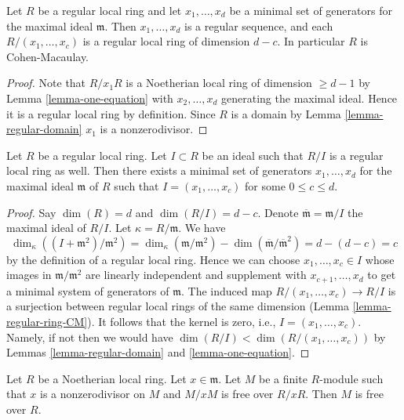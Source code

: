 \begin{lemma}
\label{lemma-regular-ring-CM}
Let $R$ be a regular local ring and let
$x_1, \ldots, x_d$ be a minimal set of generators
for the maximal ideal $\mathfrak m$. Then
$x_1, \ldots, x_d$ is a regular sequence, and
each $R/(x_1, \ldots, x_c)$ is a regular local ring
of dimension $d - c$. In particular $R$ is Cohen-Macaulay.
\end{lemma}

\begin{proof}
Note that $R/x_1R$ is a Noetherian local ring of dimension $\geq d - 1$
by Lemma \ref{lemma-one-equation} with $x_2, \ldots, x_d$
generating the maximal ideal. Hence it is a regular local ring by definition.
Since $R$ is a domain by Lemma \ref{lemma-regular-domain}
$x_1$ is a nonzerodivisor.
\end{proof}

\begin{lemma}
\label{lemma-regular-quotient-regular}
Let $R$ be a regular local ring. Let $I \subset R$ be an ideal
such that $R/I$ is a regular local ring as well. Then
there exists a minimal set of generators $x_1, \ldots, x_d$
for the maximal ideal $\mathfrak m$ of $R$ such that
$I = (x_1, \ldots, x_c)$ for some $0 \leq c \leq d$.
\end{lemma}

\begin{proof}
Say $\dim(R) = d$ and $\dim(R/I) = d - c$.
Denote $\overline{\mathfrak m} = \mathfrak m/I$ the
maximal ideal of $R/I$. Let $\kappa = R/\mathfrak m$. We have
$$
\dim_\kappa((I + \mathfrak m^2)/\mathfrak m^2) =
\dim_\kappa(\mathfrak m/\mathfrak m^2)
- \dim(\overline{\mathfrak m}/\overline{\mathfrak m}^2) = d - (d - c) = c
$$
by the definition of a regular local ring. Hence we can choose
$x_1, \ldots, x_c \in I$ whose images in $\mathfrak m/\mathfrak m^2$
are linearly independent and supplement with
$x_{c + 1}, \ldots, x_d$ to get a minimal system of generators of
$\mathfrak m$. The induced map $R/(x_1, \ldots, x_c) \to R/I$ is a
surjection between regular local rings of the same dimension
(Lemma \ref{lemma-regular-ring-CM}). It follows that
the kernel is zero, i.e., $I = (x_1, \ldots, x_c)$. Namely, if not
then we would have $\dim(R/I) < \dim(R/(x_1, \ldots, x_c))$ by
Lemmas \ref{lemma-regular-domain} and \ref{lemma-one-equation}.
\end{proof}

\begin{lemma}
\label{lemma-free-mod-x}
Let $R$ be a Noetherian local ring.
Let $x \in \mathfrak m$.
Let $M$ be a finite $R$-module such that
$x$ is a nonzerodivisor on $M$ and
$M/xM$ is free over $R/xR$.
Then $M$ is free over $R$.
\end{lemma}

